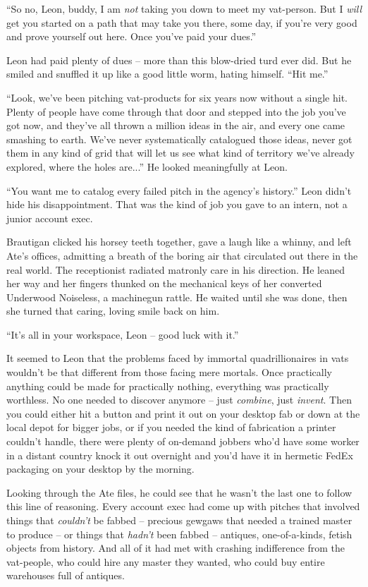 “So no, Leon, buddy, I am \emph{not} taking you down to meet my 
vat-person. But I \emph{will} get you started on a path that may take 
you there, some day, if you're very good and prove yourself out here. 
Once you've paid your dues.”

Leon had paid plenty of dues -- more than this blow-dried turd ever 
did. But he smiled and snuffled it up like a good little worm, hating 
himself. “Hit me.”

“Look, we've been pitching vat-products for six years now without a 
single hit. Plenty of people have come through that door and stepped 
into the job you've got now, and they've all thrown a million ideas in 
the air, and every one came smashing to earth. We've never 
systematically catalogued those ideas, never got them in any kind of 
grid that will let us see what kind of territory we've already 
explored, where the holes are...” He looked meaningfully at Leon.

“You want me to catalog every failed pitch in the agency's 
history.” Leon didn't hide his disappointment. That was the kind of 
job you gave to an intern, not a junior account exec.

Brautigan clicked his horsey teeth together, gave a laugh like a 
whinny, and left Ate's offices, admitting a breath of the boring air 
that circulated out there in the real world. The receptionist radiated 
matronly care in his direction. He leaned her way and her fingers 
thunked on the mechanical keys of her converted Underwood Noiseless, a 
machinegun rattle. He waited until she was done, then she turned that 
caring, loving smile back on him.

“It's all in your workspace, Leon -- good luck with it.”

\tb

It seemed to Leon that the problems faced by immortal quadrillionaires 
in vats wouldn't be that different from those facing mere mortals. Once 
practically anything could be made for practically nothing, everything 
was practically worthless. No one needed to discover anymore -- just 
\emph{combine}, just \emph{invent}. Then you could either hit a button 
and print it out on your desktop fab or down at the local depot for 
bigger jobs, or if you needed the kind of fabrication a printer 
couldn't handle, there were plenty of on-demand jobbers who'd have some 
worker in a distant country knock it out overnight and you'd have it in 
hermetic FedEx packaging on your desktop by the morning.

Looking through the Ate files, he could see that he wasn't the last one 
to follow this line of reasoning. Every account exec had come up with 
pitches that involved things that \emph{couldn't} be fabbed -- precious 
gewgaws that needed a trained master to produce -- or things that 
\emph{hadn't} been fabbed -- antiques, one-of-a-kinds, fetish objects 
from history. And all of it had met with crashing indifference from the 
vat-people, who could hire any master they wanted, who could buy entire 
warehouses full of antiques.

